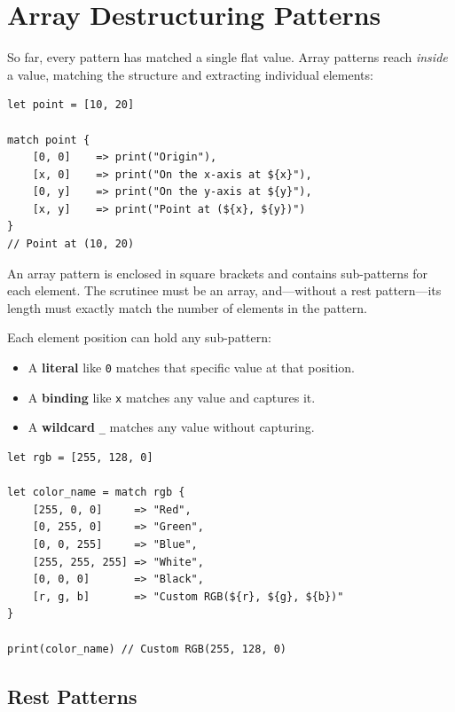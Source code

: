 \section{Array Destructuring Patterns}\label{sec:array-patterns}

So far, every pattern has matched a single flat value. Array patterns reach \emph{inside} a value, matching the structure and extracting individual elements:

\begin{lstlisting}[language=Lattice, caption={Basic array destructuring}]
let point = [10, 20]

match point {
    [0, 0]    => print("Origin"),
    [x, 0]    => print("On the x-axis at ${x}"),
    [0, y]    => print("On the y-axis at ${y}"),
    [x, y]    => print("Point at (${x}, ${y})")
}
// Point at (10, 20)
\end{lstlisting}

An array pattern is enclosed in square brackets and contains sub-patterns for each element. The scrutinee must be an array, and---without a rest pattern---its length must exactly match the number of elements in the pattern.

Each element position can hold any sub-pattern:
\begin{itemize}
  \item A \textbf{literal} like \lstinline|0| matches that specific value at that position.
  \item A \textbf{binding} like \lstinline|x| matches any value and captures it.
  \item A \textbf{wildcard} \lstinline|_| matches any value without capturing.
\end{itemize}

\begin{lstlisting}[language=Lattice, caption={Mixing literal and binding sub-patterns}]
let rgb = [255, 128, 0]

let color_name = match rgb {
    [255, 0, 0]     => "Red",
    [0, 255, 0]     => "Green",
    [0, 0, 255]     => "Blue",
    [255, 255, 255] => "White",
    [0, 0, 0]       => "Black",
    [r, g, b]       => "Custom RGB(${r}, ${g}, ${b})"
}

print(color_name) // Custom RGB(255, 128, 0)
\end{lstlisting}

\subsection{Rest Patterns}\label{sec:rest-patterns}

